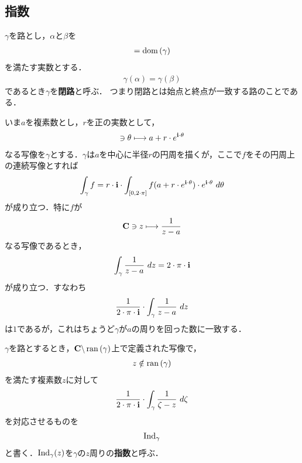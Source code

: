 \subsection{指数}
	\begin{screen}
		\begin{dfn}[閉路]
			$\gamma$を路とし，$\alpha$と$\beta$を
			\begin{align}
				[\alpha,\beta] = \dom{\gamma}
			\end{align}
			を満たす実数とする．
			\begin{align}
				\gamma(\alpha) = \gamma(\beta)
			\end{align}
			であるとき$\gamma$を{\bf 閉路}と呼ぶ．
			つまり閉路とは始点と終点が一致する路のことである．
		\end{dfn}
	\end{screen}
	
	いま$a$を複素数とし，$r$を正の実数として，
	\begin{align}
		[0,2 \cdot \pi] \ni \theta \longmapsto a + r \cdot e^{\isym \cdot \theta}
	\end{align}
	なる写像を$\gamma$とする．$\gamma$は$a$を中心に半径$r$の円周を描くが，ここで$f$をその円周上の連続写像とすれば
	\begin{align}
		\int_{\gamma} f 
		= r \cdot \mathbf{i} \cdot \int_{[0,2 \cdot \pi]} f(a + r \cdot e^{\mathbf{i} \cdot \theta}) \cdot e^{\mathbf{i} \cdot \theta}\ d\theta
	\end{align}
	が成り立つ．特に$f$が
	\begin{align}
		\mathbf{C} \ni z \longmapsto \frac{1}{z - a}
	\end{align}
	なる写像であるとき，
	\begin{align}
		\int_{\gamma} \frac{1}{z - a}\ dz = 2 \cdot \pi \cdot \mathbf{i}
	\end{align}
	が成り立つ．すなわち
	\begin{align}
		\frac{1}{2 \cdot \pi \cdot \mathbf{i}} \cdot \int_{\gamma} \frac{1}{z - a}\ dz
	\end{align}
	は$1$であるが，これはちょうど$\gamma$が$a$の周りを回った数に一致する．
	
	\begin{screen}
		\begin{dfn}[指数]
			$\gamma$を路とするとき，$\mathbf{C} \backslash \operatorname*{ran} \left(\gamma\right)$上で定義された写像で，
			\begin{align}
				z \notin \operatorname*{ran} \left(\gamma\right)
			\end{align}
			を満たす複素数$z$に対して
			\begin{align}
				\frac{1}{2 \cdot \pi \cdot \mathbf{i}} \cdot \int_{\gamma} \frac{1}{\zeta - z}\ d\zeta
			\end{align}
			を対応させるものを
			\begin{align}
				\operatorname{Ind}_{\gamma}
			\end{align}
			と書く．$\operatorname{Ind}_{\gamma}(z)$を$\gamma$の$z$周りの{\bf 指数}\index{しすう@指数}{\bf (index)}と呼ぶ．
		\end{dfn}
	\end{screen}
	
